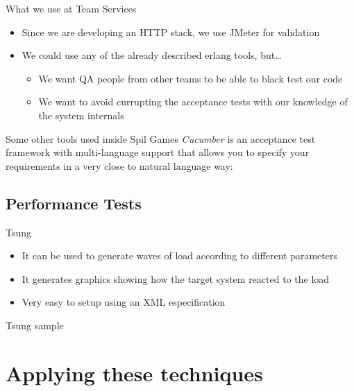 \documentclass[pdf]{beamer}
\begin{document}
\begin{frame}{What we use at Team Services}
    \begin{itemize}
    \item Since we are developing an HTTP stack, we use JMeter for validation
    \item We could use any of the already described erlang tools, but\dots
    \pause
        \begin{itemize}
        \item We want QA people from other teams to be able to black test our code
        \item We want to avoid currupting the acceptance tests with our knowledge of the system internals
        \end{itemize}
    \end{itemize}
\end{frame}

\begin{frame}{Some other tools used inside Spil Games}
    \emph{Cucumber} is an acceptance test framework with multi-language support that allows you to specify your
    requirements in a very close to natural language way:
\end{frame}

\subsection*{Performance Tests}
\label{performance_tests}

\begin{frame}{Tsung}
    \begin{itemize}
    \item It can be used to generate waves of load according to different parameters
    \item It generates graphics showing how the target system reacted to the load
    \item Very easy to setup using an XML especification
    \end{itemize}
\end{frame}

\begin{frame}{Tsung sample}
\end{frame}

\section*{Applying these techniques}
\label{applying_these_techniques}
\end{document}

